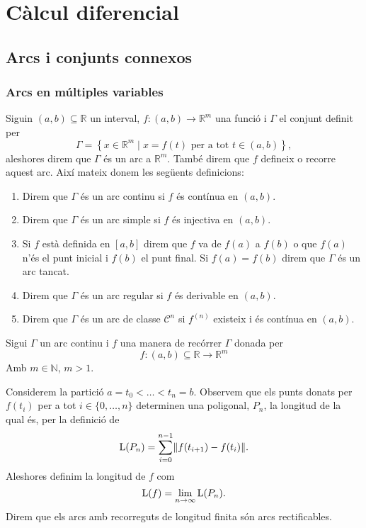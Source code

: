 \documentclass[../Apunts.tex]{subfiles}
\begin{document}
	\chapter{Càlcul diferencial}
	\section{Arcs i conjunts connexos}
	\subsection{Arcs en múltiples variables}
	\begin{definition}
		\label{def:arc}
		\label{def:arc continu}
		\label{def:arc simple}
		\label{def:arc tancat}
		\label{def:arc regular}
		\label{def:arc de classe de diferenciabilitat n}
		Siguin \((a,b)\subseteq\mathbb{R}\) un interval, \(f\colon(a,b)\to\mathbb{R}^{m}\) una funció i \(\Gamma\) el conjunt definit per
		\[\Gamma=\left\{x\in\mathbb{R}^{m}\mid x=f(t)\text{ per a tot }t\in(a,b)\right\},\]
		aleshores direm que \(\Gamma\) és un arc a \(\mathbb{R}^{m}\). També direm que \(f\) defineix o recorre aquest arc.
		Així mateix donem les següents definicions:
		\begin{enumerate}
			\item Direm que \(\Gamma\) és un arc continu si \(f\) és contínua en \((a,b)\).
			\item Direm que \(\Gamma\) és un arc simple si \(f\) és injectiva en \((a,b)\).
			\item Si \(f\) està definida en \([a,b]\) direm que \(f\) va de \(f(a)\) a \(f(b)\) o que \(f(a)\) n'és el punt inicial i \(f(b)\) el punt final. Si \(f(a)=f(b)\) direm que \(\Gamma\) és un arc tancat.
			\item Direm que \(\Gamma\) és un arc regular si \(f\) és derivable en \((a,b)\).
			\item Direm que \(\Gamma\) és un arc de classe \(\mathcal{C}^{n}\) si \(f^{(n)}\) existeix i és contínua en \((a,b)\).
		\end{enumerate}
	\end{definition}
	\begin{definition}
		\label{def:long recorregut arc continu}
		Sigui \(\Gamma\) un arc continu i \(f\) una manera de recórrer \(\Gamma\) donada per
		\[f\colon(a,b)\subseteq\mathbb{R}\longrightarrow\mathbb{R}^{m}\]
		Amb \(m\in\mathbb{N}\), \(m>1\).
		
		Considerem la partició \(a=t_{0}<\dots<t_{n}=b\). Observem que els punts donats per \(f(t_{i})\) per a tot \(i\in\{0,\dots,n\}\) determinen una poligonal, \(P_{n}\), la longitud de la qual és, per la definició de 
		\[\Long(P_{n})=\sum_{i=0}^{n-1}\norm{f(t_{i+1})-f(t_{i})}.\]
		Aleshores definim la longitud de \(f\) com
		\[\operatorname{L}(f)=\lim_{n\to\infty}\operatorname{L}(P_{n}).\]
		Direm que els arcs amb recorreguts de longitud finita són arcs rectificables.
	\end{definition}
\end{document}
